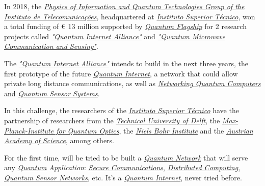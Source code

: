 \documentclass[conference]{IEEEtran}
\begin{document}
\vspace{4pt}

In 2018, the \href{https://www.it.pt/}{\textit{Physics of Information and Quantum Technologies Group of the Instituto de Telecomunica\c{c}\"oes}}, headquartered at \href{https://tecnico.ulisboa.pt/}{\textit{Instituto Superior T\'ecnico}}, won a total funding of \euro\hspace{0.05mm} 13 million supported by \href{https://qt.eu/}{\textit{Quantum Flagship}} for 2 research projects called \href{http://quantum-internet.team/}{\textit{"Quantum Internet Alliance"}} and \href{https://ec.europa.eu/digital-single-market/en/content/qmics-quantum-microwave-communication-and-sensing}{\textit{"Quantum Microwave Communication and Sensing"}}.

\newpage

The \href{http://quantum-internet.team/}{\textit{"Quantum Internet Alliance"}} intends to build in the next three years, the first prototype of the future \href{https://en.wikipedia.org/wiki/Quantum_network#Quantum_internet}{\textit{Quantum Internet}}, a network that could allow private long distance communications, as well as \href{https://en.wikipedia.org/wiki/Quantum_network}{\textit{Networking Quantum Computers}} and \href{https://en.wikipedia.org/wiki/Quantum_sensor}{\textit{Quantum Sensor Systems}}.

\vspace{4pt}

In this challenge, the researchers of the \href{https://tecnico.ulisboa.pt/}{\textit{Instituto Superior T\'ecnico}} have the partnership of researchers from the \href{https://www.tudelft.nl/}{\textit{Technical University of Delft}}, the \href{https://www.mpq.mpg.de/}{\textit{Max-Planck-Institute for Quantum Optics}}, the \href{https://www.nbi.ku.dk/}{\textit{Niels Bohr Institute}} and the \href{https://www.oeaw.ac.at/}{\textit{Austrian Academy of Science}}, among others.

\vspace{4pt}

For the first time, will be tried to be built a \href{https://en.wikipedia.org/wiki/Quantum_network}{\textit{Quantum Network}} that will serve any \href{https://en.wikipedia.org/wiki/Quantum}{\textit{Quantum}} \textit{Application}: \href{https://en.wikipedia.org/wiki/Secure_communication}{\textit{Secure Communications}}, \href{https://en.wikipedia.org/wiki/Distributed_computing}{\textit{Distributed Computing}}, \href{https://en.wikipedia.org/wiki/Quantum_sensor}{\textit{Quantum Sensor Networks}}, etc. It's a \href{https://en.wikipedia.org/wiki/Quantum_network#Quantum_internet}{\textit{Quantum Internet}}, never tried before.
\end{document}
